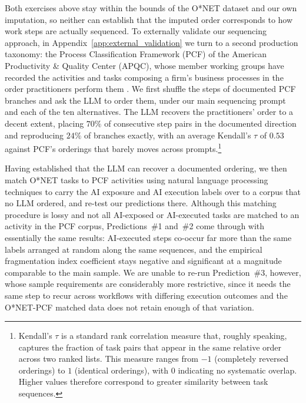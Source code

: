 Both exercises above stay within the bounds of the O*NET dataset and our own imputation, so neither can establish that the imputed order corresponds to how work steps are actually sequenced.
To externally validate our sequencing approach, in Appendix~\ref{app:external_validation} we turn to a second production taxonomy: the Process Classification Framework (PCF) of the American Productivity \& Quality Center (APQC), whose member working groups have recorded the activities and tasks composing a firm's business processes in the order practitioners perform them \citep{apqc_pcf}.
We first shuffle the steps of documented PCF branches and ask the LLM to order them, under our main sequencing prompt and each of the ten alternatives.
The LLM recovers the practitioners' order to a decent extent, placing $70\%$ of consecutive step pairs in the documented direction and reproducing $24\%$ of branches exactly, with an average Kendall's $\tau$ of $0.53$ against PCF's orderings that barely moves across prompts.\footnote{
Kendall's $\tau$ is a standard rank correlation measure that, roughly speaking, captures the fraction of task pairs that appear in the same relative order across two ranked lists.
This measure ranges from $-1$ (completely reversed orderings) to $1$ (identical orderings), with $0$ indicating no systematic overlap.  
Higher values therefore correspond to greater similarity between task sequences.
}

Having established that the LLM can recover a documented ordering, we then match O*NET tasks to PCF activities using natural language processing techniques to carry the AI exposure and AI execution labels over to a corpus that no LLM ordered, and re-test our predictions there.
Although this matching procedure is lossy and not all AI-exposed or AI-executed tasks are matched to an activity in the PCF corpus, Predictions~\#1 and~\#2 come through with essentially the same results: AI-executed steps co-occur far more than the same labels arranged at random along the same sequences, and the empirical fragmentation index coefficient stays negative and significant at a magnitude comparable to the main sample.
We are unable to re-run Prediction~\#3, however, whose sample requirements are considerably more restrictive, since it needs the same step to recur across workflows with differing execution outcomes and the O*NET-PCF matched data does not retain enough of that variation.